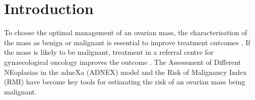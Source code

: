 \newpage

\section{Introduction}

To choose the optimal management of an ovarian mass, the characterisation of the
mass as benign or malignant is essential to improve treatment outcomes
 \cite{timmermanESGOISUOGIOTA2021,ledermannESGOESMOESP2024}.
If the mass is likely to be malignant, treatment in a referral centre for
gynaecological oncology improves the outcome
 \cite{harterImpactStructuredQuality2011,alettiQualityImprovementSurgical2009}.
The Assessment of Different NEoplasias in the adneXa (\gls{ADNEX}) model
 \cite{vancalsterEvaluatingRiskOvarian2014} and the Risk of Malignancy Index (\gls{RMI})
 \cite{jacobsRiskMalignancyIndex1990} have become key tools for estimating the risk
of an ovarian mass being malignant.

